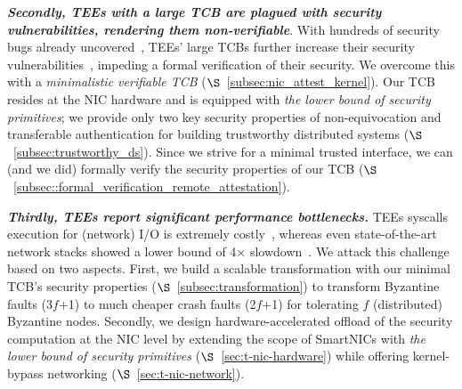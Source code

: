 {\bf \em Secondly, TEEs with a large TCB are plagued with security vulnerabilities, rendering them non-verifiable}. With hundreds of security bugs already uncovered~\cite{10.1145/3456631}, TEEs' large TCBs further increase their security vulnerabilities~\cite{10.1145/3379469, 10.5555/1756748.1756832}, impeding a formal verification of their security. We overcome this with a {\em minimalistic verifiable TCB} ($\S$~\ref{subsec:nic_attest_kernel}). Our TCB resides at the NIC hardware and is equipped with {\em the lower bound of security primitives};  we provide only two key security properties of non-equivocation and transferable authentication for building trustworthy distributed systems ($\S$~\ref{subsec:trustworthy_ds}). Since we strive for a minimal trusted interface, we can (and we did) formally verify the security properties of our TCB ($\S$~\ref{subsec::formal_verification_remote_attestation}). 

{\bf \em Thirdly, TEEs report significant performance bottlenecks.} TEEs syscalls execution for (network) I/O is extremely costly~\cite{hotcalls}, whereas even state-of-the-art network stacks showed a lower bound of 4$\times$ slowdown~\cite{avocado}. We attack this challenge based on two aspects. First, we build a scalable transformation with our minimal TCB's security properties ($\S$~\ref{subsec:transformation}) to transform Byzantine faults (3$f$+1) to much cheaper crash faults (2$f$+1) for tolerating $f$  (distributed) Byzantine nodes.  Secondly, we design hardware-accelerated offload of the security computation at the NIC level by extending the scope of SmartNICs with {\em the lower bound of security primitives} ($\S$~\ref{sec:t-nic-hardware}) while offering kernel-bypass networking ($\S$~\ref{sec:t-nic-network}).


